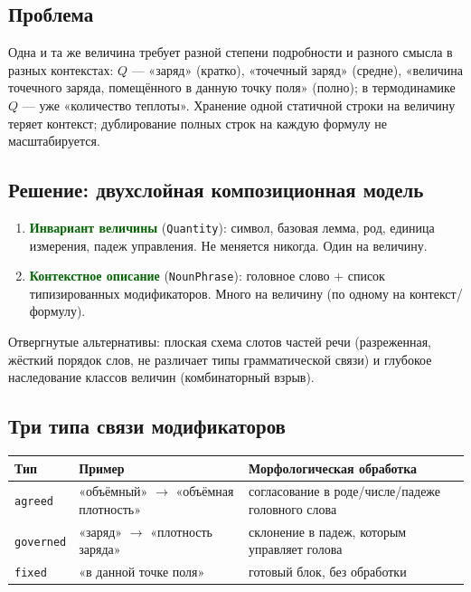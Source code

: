 \documentclass[12pt,a4paper]{article}
\newcommand{\idea}[1]{\textcolor{darkgreen}{\textbf{#1}}}
\begin{document}
\subsection{Проблема}
Одна и та же величина требует разной степени подробности и разного смысла в разных контекстах: $Q$ --- «заряд» (кратко), «точечный заряд» (средне), «величина точечного заряда, помещённого в данную точку поля» (полно); в термодинамике $Q$ --- уже «количество теплоты». Хранение одной статичной строки на величину теряет контекст; дублирование полных строк на каждую формулу не масштабируется.

\subsection{Решение: двухслойная композиционная модель}
\begin{enumerate}
  \item \idea{Инвариант величины} (\texttt{Quantity}): символ, базовая лемма, род, единица измерения, падеж управления. Не меняется никогда. Один на величину.
  \item \idea{Контекстное описание} (\texttt{NounPhrase}): головное слово + список типизированных модификаторов. Много на величину (по одному на контекст/формулу).
\end{enumerate}

Отвергнутые альтернативы: плоская схема слотов частей речи (разреженная, жёсткий порядок слов, не различает типы грамматической связи) и глубокое наследование классов величин (комбинаторный взрыв).

\subsection{Три типа связи модификаторов}
\begin{center}
\begin{tabular}{@{}llp{6.2cm}@{}}
\toprule
\textbf{Тип} & \textbf{Пример} & \textbf{Морфологическая обработка} \\
\midrule
\texttt{agreed}   & «объёмный» $\to$ «объёмная плотность» & согласование в роде/числе/падеже головного слова \\
\texttt{governed} & «заряд» $\to$ «плотность заряда»    & склонение в падеж, которым управляет голова \\
\texttt{fixed}    & «в данной точке поля»               & готовый блок, без обработки \\
\bottomrule
\end{tabular}
\end{center}
\end{document}
